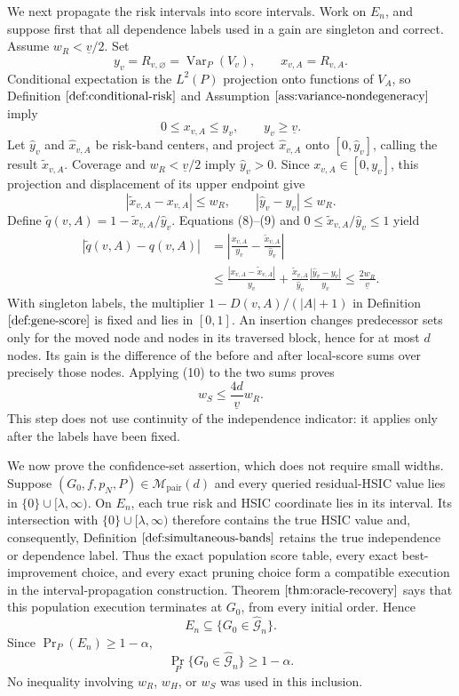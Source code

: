 We next propagate the risk intervals into score intervals. Work on \(E_n\), and suppose first that all dependence labels used in a gain are singleton and correct. Assume \(w_R<\underline v/2\). Set
\[
y_v=R_{v,\varnothing}=\operatorname{Var}_P(V_v),
\qquad x_{v,A}=R_{v,A}.
\]
Conditional expectation is the \(L^2(P)\) projection onto functions of \(V_A\), so Definition \(\ref{def:conditional-risk}\) and Assumption \(\ref{ass:variance-nondegeneracy}\) imply
\[
0\le x_{v,A}\le y_v,
\qquad y_v\ge\underline v. \tag{8}
\]
Let \(\widehat y_v\) and \(\widehat x_{v,A}\) be risk-band centers, and project \(\widehat x_{v,A}\) onto \([0,\widehat y_v]\), calling the result \(\widetilde x_{v,A}\). Coverage and \(w_R<\underline v/2\) imply \(\widehat y_v>0\). Since \(x_{v,A}\in[0,y_v]\), this projection and displacement of its upper endpoint give
\[
|\widetilde x_{v,A}-x_{v,A}|\le w_R,
\qquad |\widehat y_v-y_v|\le w_R. \tag{9}
\]
Define \(\widetilde q(v,A)=1-\widetilde x_{v,A}/\widehat y_v\). Equations (8)--(9) and \(0\le\widetilde x_{v,A}/\widehat y_v\le1\) yield
\[
\begin{aligned}
|\widetilde q(v,A)-q(v,A)|
&=\left|\frac{x_{v,A}}{y_v}-\frac{\widetilde x_{v,A}}{\widehat y_v}\right|\\
&\le\frac{|x_{v,A}-\widetilde x_{v,A}|}{y_v}
+\frac{\widetilde x_{v,A}}{\widehat y_v}
  \frac{|\widehat y_v-y_v|}{y_v}
\le\frac{2w_R}{\underline v}. \tag{10}
\end{aligned}
\]
With singleton labels, the multiplier \(1-D(v,A)/(|A|+1)\) in Definition \(\ref{def:gene-score}\) is fixed and lies in \([0,1]\). An insertion changes predecessor sets only for the moved node and nodes in its traversed block, hence for at most \(d\) nodes. Its gain is the difference of the before and after local-score sums over precisely those nodes. Applying (10) to the two sums proves
\[
w_S\le\frac{4d}{\underline v}w_R. \tag{11}
\]
This step does not use continuity of the independence indicator: it applies only after the labels have been fixed.

We now prove the confidence-set assertion, which does not require small widths. Suppose \((G_0,f,p_N,P)\in\mathcal M_{\mathrm{pair}}(d)\) and every queried residual-HSIC value lies in \(\{0\}\cup[\lambda,\infty)\). On \(E_n\), each true risk and HSIC coordinate lies in its interval. Its intersection with \(\{0\}\cup[\lambda,\infty)\) therefore contains the true HSIC value and, consequently, Definition \(\ref{def:simultaneous-bands}\) retains the true independence or dependence label. Thus the exact population score table, every exact best-improvement choice, and every exact pruning choice form a compatible execution in the interval-propagation construction. Theorem \(\ref{thm:oracle-recovery}\) says that this population execution terminates at \(G_0\), from every initial order. Hence
\[
E_n\subseteq\{G_0\in\widehat{\mathcal G}_n\}.
\]
Since \(\Pr_P(E_n)\ge1-\alpha\),
\[
\Pr_P\{G_0\in\widehat{\mathcal G}_n\}\ge1-\alpha. \tag{12}
\]
No inequality involving \(w_R\), \(w_H\), or \(w_S\) was used in this inclusion.

